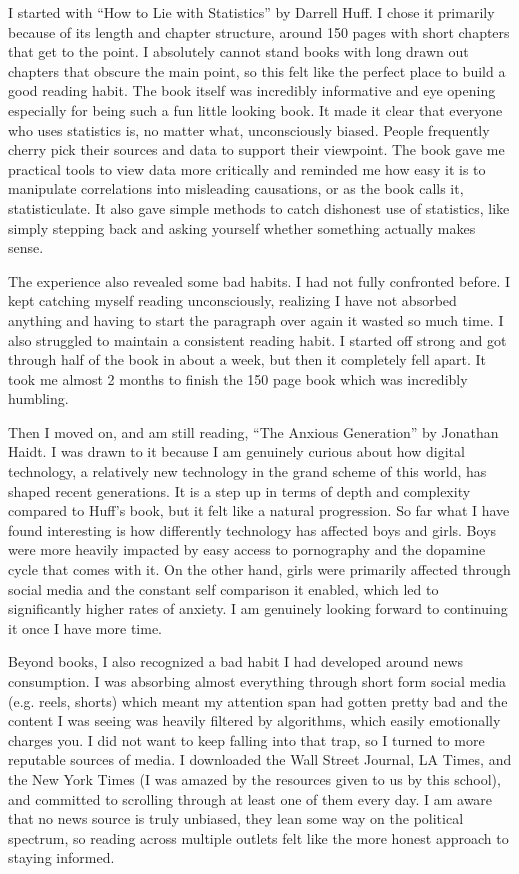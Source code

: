 \documentclass[12pt]{article}
\begin{document}
            I started with ``How to Lie with Statistics'' by Darrell Huff. I chose it primarily because of its length and chapter structure, around 150 pages with short chapters that get to the point. I absolutely cannot stand books with long drawn out chapters that obscure the main point, so this felt like the perfect place to build a good reading habit. The book itself was incredibly informative and eye opening especially for being such a fun little looking book. It made it clear that everyone who uses statistics is, no matter what, unconsciously biased. People frequently cherry pick their sources and data to support their viewpoint. The book gave me practical tools to view data more critically and reminded me how easy it is to manipulate correlations into misleading causations, or as the book calls it, statisticulate. It also gave simple methods to catch dishonest use of statistics, like simply stepping back and asking yourself whether something actually makes sense.

            The experience also revealed some bad habits. I had not fully confronted before. I kept catching myself reading unconsciously, realizing I have not absorbed anything and having to start the paragraph over again it wasted so much time. I also struggled to maintain a consistent reading habit. I started off strong and got through half of the book in about a week, but then it completely fell apart. It took me almost 2 months to finish the 150 page book which was incredibly humbling.

            Then I moved on, and am still reading, ``The Anxious Generation'' by Jonathan Haidt. I was drawn to it because I am genuinely curious about how digital technology, a relatively new technology in the grand scheme of this world, has shaped recent generations. It is a step up in terms of depth and complexity compared to Huff's book, but it felt like a natural progression. So far what I have found interesting is how differently technology has affected boys and girls. Boys were more heavily impacted by easy access to pornography and the dopamine cycle that comes with it. On the other hand, girls were primarily affected through social media and the constant self comparison it enabled, which led to significantly higher rates of anxiety. I am genuinely looking forward to continuing it once I have more time.

            Beyond books, I also recognized a bad habit I had developed around news consumption. I was absorbing almost everything through short form social media (e.g. reels, shorts) which meant my attention span had gotten pretty bad and the content I was seeing was heavily filtered by algorithms, which easily emotionally charges you. I did not want to keep falling into that trap, so I turned to more reputable sources of media. I downloaded the Wall Street Journal, LA Times, and the New York Times (I was amazed by the resources given to us by this school), and committed to scrolling through at least one of them every day. I am aware that no news source is truly unbiased, they lean some way on the political spectrum, so reading across multiple outlets felt like the more honest approach to staying informed.
\end{document}
